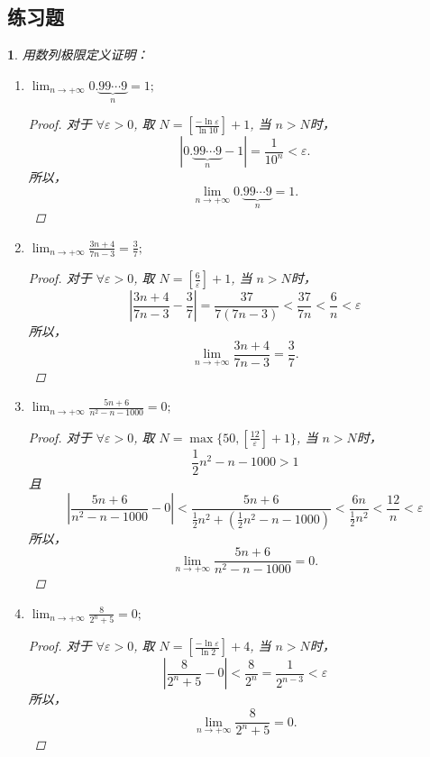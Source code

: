 \documentclass[utf8]{book}
\newtheorem{example}{}[section]             %
\begin{document}
\subsection{练习题}
\begin{example}用数列极限定义证明：
\begingroup
\renewcommand\labelenumi{\normalfont(\theenumi)}
\begin{enumerate}
        \item $\displaystyle \lim_{n\to +\infty} 0.\underbrace{99\cdots9}_{n} = 1;$
        \begin{proof}
        对于 $\forall \varepsilon > 0$, 取 $N = \left [ \frac{-\ln\varepsilon}{\ln 10}\right ] + 1$, 当 $n > N$时，
        $$\left | 0.\underbrace{99\cdots9}_{n} - 1\right | = \frac{1}{10^n} < \varepsilon.$$
        所以， $$\lim_{n\to +\infty} 0.\underbrace{99\cdots9}_{n} = 1.$$
        \end{proof}
       
        \item $\displaystyle \lim_{n\to +\infty}\frac{3n+4}{7n-3} = \frac{3}{7};$
        \begin{proof}
        对于 $\forall \varepsilon > 0$, 取 $N = \left [ \frac{6}{\varepsilon}\right ] + 1$, 当 $n > N$时，
        $$\left | \frac{3n+4}{7n-3} - \frac{3}{7}\right | = \frac{37}{7(7n-3)} < \frac{37}{7n} < \frac{6}{n} < \varepsilon$$
        所以， $$\lim_{n\to +\infty}\frac{3n+4}{7n-3} = \frac{3}{7}.$$
        \end{proof}
        
        \item $\displaystyle \lim_{n\to +\infty}\frac{5n+6}{n^2-n-1000} = 0;$
        \begin{proof}
        对于 $\forall \varepsilon > 0$, 取 $N = \max\{50, \left [ \frac{12}{\varepsilon}\right ] + 1\}$, 当 $n > N$时，
        $$\frac{1}{2}n^2 - n - 1000 > 1$$ 且
        $$\left | \frac{5n+6}{n^2-n-1000} - 0\right | < \frac{5n + 6}{\frac{1}{2}n^2 + (\frac{1}{2}n^2 - n - 1000)} < \frac{6n}{\frac{1}{2}n^2} < \frac{12}{n} < \varepsilon$$
        所以， $$\lim_{n\to +\infty}\frac{5n+6}{n^2-n-1000} = 0.$$  
        \end{proof}
        
        \item $\displaystyle \lim_{n\to +\infty}\frac{8}{2^n+5} = 0;$
        \begin{proof}
         对于 $\forall \varepsilon > 0$, 取 $N = \left [ \frac{-\ln\varepsilon}{\ln2}\right ] + 4$, 当 $n > N$时，
        $$\left | \frac{8}{2^n+5} - 0\right | < \frac{8}{2^n} = \frac{1}{2^{n-3}} < \varepsilon$$
        所以， $$\lim_{n\to +\infty}\frac{8}{2^n+5} = 0.$$  
        \end{proof}
        

\end{enumerate}
\end{example}
\end{document}
